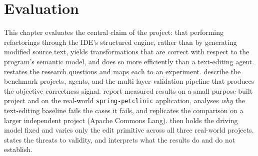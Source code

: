 %
%
\chapter{Evaluation}
\label{ch:eval}

This chapter evaluates the central claim of the project: that performing
refactorings through the IDE's structured engine, rather than by generating
modified source text, yields transformations that are correct with respect to
the program's semantic model, and does so more efficiently than a text-editing
agent.  restates the research questions and maps each to an
experiment.  describe the benchmark
projects, agents, and the multi-layer validation pipeline that produces the
objective correctness signal.  report
measured results on a small purpose-built project and on the real-world
\texttt{spring-petclinic} application,  analyses
\emph{why} the text-editing baseline fails the cases it fails, and
 replicates the comparison on a larger independent project
(Apache Commons Lang).  then holds the driving model
fixed and varies only the edit primitive across all three real-world projects.
 states the threats to validity, and 
interprets what the results do and do not establish.

